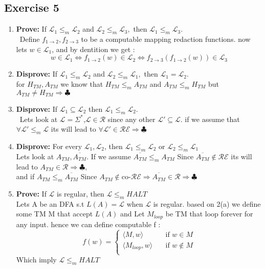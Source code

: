 \documentclass[12pt]{article}
\begin{document}
\subsection*{Exercise 5}
\begin{enumerate}[label=(\Alph*)]
\item \textbf{Prove:} If $\mathcal{L}_1 \leq_m \mathcal{L}_2$ and $\mathcal{L}_2 \leq_m \mathcal{L}_3, $ then $ \mathcal{L}_1 \leq_m \mathcal{L}_3.
$ \\\ Define $f_{1\rightarrow 2},f_{2\rightarrow 3}$ to be a computable mapping redaction  functions. now lets $w\in \mathcal{L}_1$, and by dentition  we get :
\[
w\in \mathcal{L}_1\Leftrightarrow f_{1\rightarrow 2}(w)\in \mathcal{L}_2
\Leftrightarrow f_{2\rightarrow 3}(f_{1\rightarrow 2}(w))\in \mathcal{L}_3
\]






\item \textbf{Disprove:} If $\mathcal{L}_1 \leq_m \mathcal{L}_2$ and $\mathcal{L}_2 \leq_m \mathcal{L}_1, $ then $ \mathcal{L}_1 = \mathcal{L}_2.$\\
for $H_{TM},A_{TM}$ we know that $H_{TM}\leq_m A_{TM}$ and $A_{TM}\leq_m H_{TM}$ but $A_{TM}\neq H_{TM}\Rightarrow\clubsuit$
\item \textbf{Disprove:} If $\mathcal{L}_1 \subseteq \mathcal{L}_2$  then $ \mathcal{L}_1 \leq_m \mathcal{L}_2.$\\\ Lets look at $\mathcal{L} = \Sigma^*$,$\mathcal{L} \in \mathcal{R}$ since any other $\mathcal{L}'\subseteq \mathcal{L}$. if we assume that    $\forall \mathcal{L}' \leq_m \mathcal{L}$ its will lead to  $\forall \mathcal{L} ' \in \mathcal{RE} \Rightarrow\clubsuit$
\item \textbf{Disprove:} For every  $\mathcal{L}_1,\mathcal{L}_2$, then $\mathcal{L}_1 \leq_m \mathcal{L}_2$ or $\mathcal{L}_2 \leq_m \mathcal{L}_1$\\
Lets look at $A_{TM},\overline{A_{TM}}$. If we assume $\overline{A_{TM}} \leq_m A_{TM}$ Since $\overline{A_{TM}}\notin \mathcal{RE}$
its will lead to $A_{TM}\in \mathcal{R}\Rightarrow\clubsuit$,\\ and if $A_{TM} \leq_m \overline{A_{TM}} $ Since $A_{TM}\notin \text{co-}\mathcal{RE}\Rightarrow \overline{A_{TM}}\in \mathcal{R}\Rightarrow\clubsuit$
\item \textbf{Prove:} If $\mathcal{L}$ is regular, then $\mathcal{L} \leq_m HALT$
\\Lets A  be an DFA s.t $L(A)=\mathcal{L}$ when $\mathcal{L}$ is regular. based on 2(a) we define some TM M that accept $L(A)$ and Let $M_{loop}$ be TM that loop forever for any input. hence we can define computable f :
\[f(w)=\begin{cases} 
      \langle M,w\rangle &\quad\text{if  } w\in M \\
      \langle M_{loop},w\rangle &\quad\text{if  } w\notin M\\
     \end{cases} 
\]
Which imply  $\mathcal{L} \leq_m HALT$
\end{enumerate}
\end{document}
